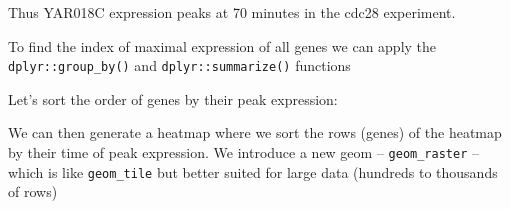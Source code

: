 \documentclass[]{book}
\newenvironment{Shaded}{\begin{snugshade}}{\end{snugshade}}
\newcommand{\CommentTok}[1]{\textcolor[rgb]{0.56,0.35,0.01}{\textit{#1}}}
\newcommand{\DataTypeTok}[1]{\textcolor[rgb]{0.13,0.29,0.53}{#1}}
\newcommand{\KeywordTok}[1]{\textcolor[rgb]{0.13,0.29,0.53}{\textbf{#1}}}
\newcommand{\NormalTok}[1]{#1}
\newcommand{\OperatorTok}[1]{\textcolor[rgb]{0.81,0.36,0.00}{\textbf{#1}}}
\newcommand{\StringTok}[1]{\textcolor[rgb]{0.31,0.60,0.02}{#1}}
\theoremstyle{definition}
\theoremstyle{definition}
\theoremstyle{definition}
\theoremstyle{remark}
\begin{document}
\begin{Shaded}
\end{Shaded}

Thus YAR018C expression peaks at 70 minutes in the cdc28 experiment.

To find the index of maximal expression of all genes we can apply the
\texttt{dplyr::group\_by()} and \texttt{dplyr::summarize()} functions

\begin{Shaded}
\end{Shaded}

Let's sort the order of genes by their peak expression:

\begin{Shaded}
\end{Shaded}

We can then generate a heatmap where we sort the rows (genes) of the
heatmap by their time of peak expression. We introduce a new geom --
\texttt{geom\_raster} -- which is like \texttt{geom\_tile} but better
suited for large data (hundreds to thousands of rows)
\end{document}
